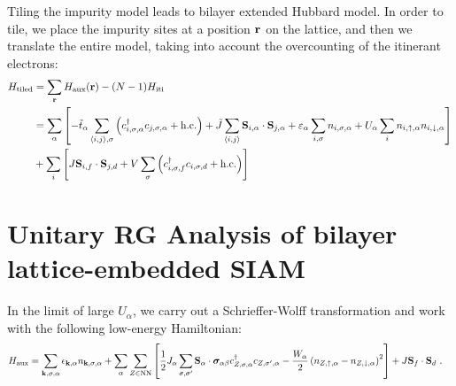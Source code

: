 \documentclass[%
reprint,
superscriptaddress,
groupedaddress,
superscriptaddress,
onecolumn,
10pt
]{revtex4-2}
\begin{document}
Tiling the impurity model leads to bilayer extended Hubbard model. In order to tile, we place the impurity sites at a position \({\bf r}\) on the lattice, and then we translate the entire model, taking into account the overcounting of the itinerant electrons:
\begin{equation}\begin{aligned}
	H_\text{tiled} &= \sum_{{\bf r}}H_\text{aux}({\bf r}) - (N-1) H_\text{iti} \\
	&= \sum_\alpha\left[-\tilde t_\alpha\sum_{\braket{i,j},\sigma}\left(c^\dagger_{i,\sigma,\alpha}c_{j,\sigma,\alpha} + \text{h.c.}\right) + \tilde J \sum_{\braket{i,j}}{\bf S}_{i,\alpha} \cdot {\bf S}_{j,\alpha} + \varepsilon_\alpha \sum_{i,\sigma}n_{i,\sigma,\alpha} + U_\alpha \sum_i n_{i,\uparrow,\alpha}n_{i,\downarrow,\alpha} \right] \\
	 &+ \sum_i \left[J {\bf S}_{i,f} \cdot {\bf S}_{j,d} + V\sum_\sigma\left(c^\dagger_{i,\sigma,f}c_{i,\sigma,d} + \text{h.c.}\right) \right]	
\end{aligned}\end{equation}

\section{Unitary RG Analysis of bilayer lattice-embedded SIAM}
In the limit of large \(U_\alpha\), we carry out a Schrieffer-Wolff transformation and work with the following low-energy Hamiltonian:
\begin{equation}\begin{aligned}
	H_\text{aux} &= \sum_{{\bf k},\sigma,\alpha}\epsilon_{{\bf k},\alpha}n_{{\bf k},\sigma,\alpha} + \sum_\alpha\sum_{Z \in \text{NN}}\left[\frac{1}{2}J_\alpha\sum_{\sigma,\sigma^\prime}{\bf S}_\alpha \cdot {\boldsymbol{\sigma}}_{\alpha\beta}c^\dagger_{Z,\sigma,\alpha}c_{Z,\sigma^\prime,\alpha} - \frac{W_\alpha}{2} \left(n_{Z,\uparrow,\alpha} - n_{Z,\downarrow,\alpha}\right)^2\right] + J{\bf S}_f \cdot {\bf S}_d~.
\end{aligned}\end{equation}
\end{document}
